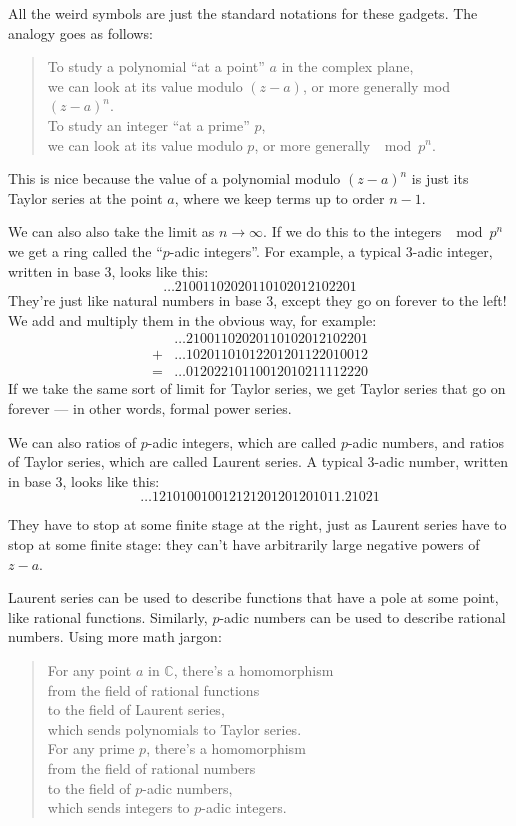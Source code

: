 \documentclass{article}
\begin{document}
All the weird symbols are just the standard notations for these gadgets.
The analogy goes as follows:

\begin{quote}
To study a polynomial ``at a point'' \(a\) in the complex plane,\\
we can look at its value modulo \((z-a)\), or more generally mod
\((z-a)^n\).\\

To study an integer ``at a prime'' \(p\),\\
we can look at its value modulo \(p\), or more generally \(\mod p^n\).
\end{quote}

This is nice because the value of a polynomial modulo \((z-a)^n\) is
just its Taylor series at the point \(a\), where we keep terms up to
order \(n-1\).

We can also also take the limit as \(n \to \infty\). If we do this to
the integers \(\mod p^n\) we get a ring called the ``\(p\)-adic
integers''. For example, a typical \(3\)-adic integer, written in base
3, looks like this: \[\ldots21001102020110102012102201\] They're just
like natural numbers in base 3, except they go on forever to the left!
We add and multiply them in the obvious way, for example: \[
  \begin{aligned}
    &\ldots21001102020110102012102201
  \\+&\ldots10201101012201201122010012
  \\=&\ldots01202210110012010211112220
  \end{aligned}
\] If we take the same sort of limit for Taylor series, we get Taylor
series that go on forever --- in other words, formal power series.

We can also ratios of \(p\)-adic integers, which are called \(p\)-adic
numbers, and ratios of Taylor series, which are called Laurent series. A
typical \(3\)-adic number, written in base 3, looks like this:
\[\ldots121010010012121201201201011.21021\]

They have to stop at some finite stage at the right, just as Laurent
series have to stop at some finite stage: they can't have arbitrarily
large negative powers of \(z-a\).

Laurent series can be used to describe functions that have a pole at
some point, like rational functions. Similarly, \(p\)-adic numbers can
be used to describe rational numbers. Using more math jargon:

\begin{quote}
For any point \(a\) in \(\mathbb{C}\), there's a homomorphism\\
from the field of rational functions\\
to the field of Laurent series,\\
which sends polynomials to Taylor series.\\

For any prime \(p\), there's a homomorphism\\
from the field of rational numbers\\
to the field of \(p\)-adic numbers,\\
which sends integers to \(p\)-adic integers.
\end{quote}
\end{document}

